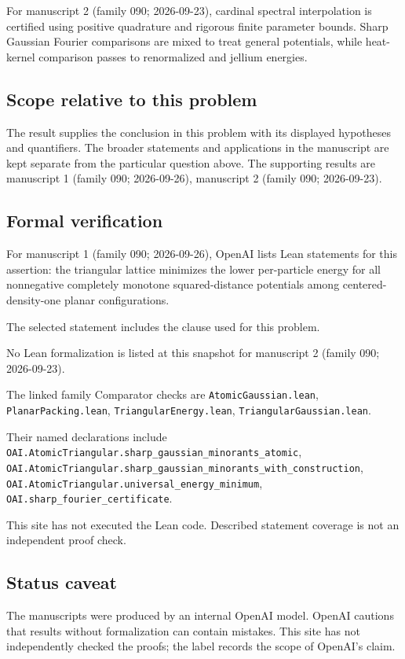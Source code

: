 \documentclass[11pt]{article}
\begin{document}
For manuscript 2 (family 090; 2026-09-23), cardinal spectral interpolation is certified using positive quadrature and rigorous finite parameter bounds. Sharp Gaussian Fourier comparisons are mixed to treat general potentials, while heat-kernel comparison passes to renormalized and jellium energies.

\subsection{Scope relative to this problem}
The result supplies the conclusion in this problem with its displayed hypotheses and quantifiers. The broader statements and applications in the manuscript are kept separate from the particular question above. The supporting results are manuscript 1 (family 090; 2026-09-26), manuscript 2 (family 090; 2026-09-23).

\subsection{Formal verification}
For manuscript 1 (family 090; 2026-09-26), OpenAI lists Lean statements for this assertion: the triangular lattice minimizes the lower per-particle energy for all nonnegative completely monotone squared-distance potentials among centered-density-one planar configurations.

The selected statement includes the clause used for this problem.

No Lean formalization is listed at this snapshot for manuscript 2 (family 090; 2026-09-23).

The linked family Comparator checks are \texttt{AtomicGaussian.lean}, \texttt{PlanarPacking.lean}, \texttt{TriangularEnergy.lean}, \texttt{TriangularGaussian.lean}.

Their named declarations include \texttt{OAI.AtomicTriangular.sharp\_gaussian\_minorants\_atomic}, \texttt{OAI.AtomicTriangular.sharp\_gaussian\_minorants\_with\_construction}, \texttt{OAI.AtomicTriangular.universal\_energy\_minimum}, \texttt{OAI.sharp\_fourier\_certificate}.

This site has not executed the Lean code. Described statement coverage is not an independent proof check.

\subsection{Status caveat}
The manuscripts were produced by an internal OpenAI model. OpenAI cautions that results without formalization can contain mistakes. This site has not independently checked the proofs; the label records the scope of OpenAI's claim.
\end{document}
